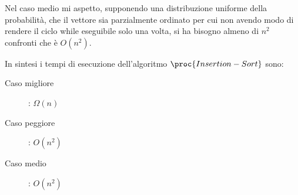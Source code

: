 Nel caso medio mi aspetto, supponendo una distribuzione uniforme della probabilità,
che il vettore sia parzialmente ordinato per cui non avendo modo di rendere il ciclo
while eseguibile solo una volta, si ha bisogno almeno di $n^2$ confronti che è $O(n^2)$.

In sintesi i tempi di esecuzione dell'algoritmo $\proc{Insertion-Sort}$ sono:
\begin{description}
  \item[Caso migliore]: $\Omega(n)$
  \item[Caso peggiore]: $O(n^2)$
  \item[Caso medio]: $O(n^2)$
\end{description}
